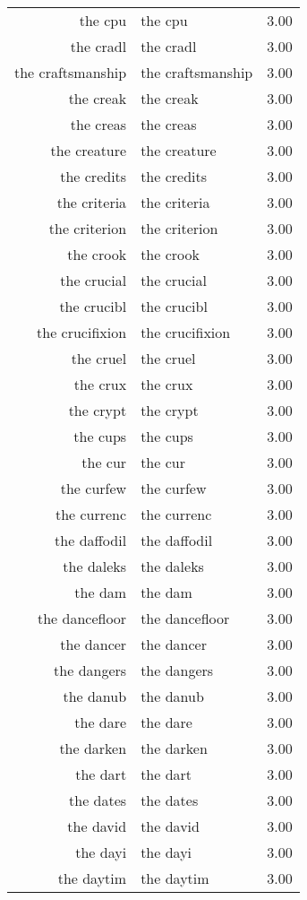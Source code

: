 \begin{table}[ht]
\begin{tabular}{rlr}
  the cpu & the cpu & 3.00 \\ 
  the cradl & the cradl & 3.00 \\ 
  the craftsmanship & the craftsmanship & 3.00 \\ 
  the creak & the creak & 3.00 \\ 
  the creas & the creas & 3.00 \\ 
  the creature & the creature & 3.00 \\ 
  the credits & the credits & 3.00 \\ 
  the criteria & the criteria & 3.00 \\ 
  the criterion & the criterion & 3.00 \\ 
  the crook & the crook & 3.00 \\ 
  the crucial & the crucial & 3.00 \\ 
  the crucibl & the crucibl & 3.00 \\ 
  the crucifixion & the crucifixion & 3.00 \\ 
  the cruel & the cruel & 3.00 \\ 
  the crux & the crux & 3.00 \\ 
  the crypt & the crypt & 3.00 \\ 
  the cups & the cups & 3.00 \\ 
  the cur & the cur & 3.00 \\ 
  the curfew & the curfew & 3.00 \\ 
  the currenc & the currenc & 3.00 \\ 
  the daffodil & the daffodil & 3.00 \\ 
  the daleks & the daleks & 3.00 \\ 
  the dam & the dam & 3.00 \\ 
  the dancefloor & the dancefloor & 3.00 \\ 
  the dancer & the dancer & 3.00 \\ 
  the dangers & the dangers & 3.00 \\ 
  the danub & the danub & 3.00 \\ 
  the dare & the dare & 3.00 \\ 
  the darken & the darken & 3.00 \\ 
  the dart & the dart & 3.00 \\ 
  the dates & the dates & 3.00 \\ 
  the david & the david & 3.00 \\ 
  the dayi & the dayi & 3.00 \\ 
  the daytim & the daytim & 3.00 \\ 

\end{tabular}
\end{table}
